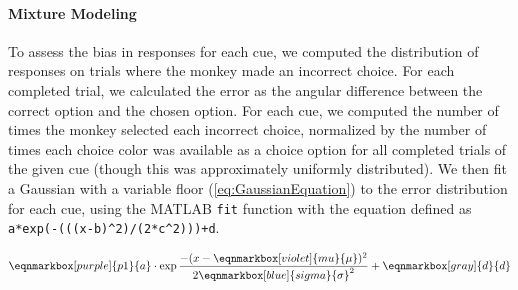 
\paragraph{Mixture Modeling}\label{para:MixtureModeling}

To assess the bias in responses for each cue, we computed the distribution of responses on trials where the monkey made an incorrect choice.
For each completed trial, we calculated the error as the angular difference between the correct option and the chosen option.  
For each cue, we computed the number of times the monkey selected each incorrect choice, normalized by the number of times each choice color was available as a choice option for all completed trials of the given cue (though this was approximately uniformly distributed).
We then fit a Gaussian with a variable floor (\autoref{eq:GaussianEquation}) to the error distribution for each cue, using the MATLAB \lstinline{fit} function with the equation defined as \lstinline{a*exp(-(((x-b)^2)/(2*c^2)))+d}. 



\vspace{2em} 
\begin{equation} \label{eq:GaussianEquation}
    \eqnmarkbox[purple]{p1}{a}
    \cdot
    \exp
    \frac{-(x-
    \eqnmarkbox[violet]{mu}{\mu}
    )^2}{2 
    \eqnmarkbox[blue]{sigma}{\sigma}^2}
    +
    \eqnmarkbox[gray]{d}{d}        
\end{equation}

\vspace{2em} 

